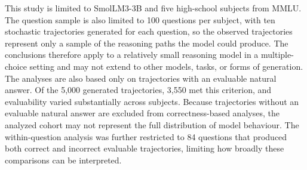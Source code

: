 \documentclass{article}
\begin{document}
This study is limited to SmolLM3-3B and five high-school subjects from MMLU. The question sample is also limited to 100 questions per subject, with ten stochastic trajectories generated for each question, so the observed trajectories represent only a sample of the reasoning paths the model could produce. The conclusions therefore apply to a relatively small reasoning model in a multiple-choice setting and may not extend to other models, tasks, or forms of generation. The analyses are also based only on trajectories with an evaluable natural answer. Of the 5,000 generated trajectories, 3,550 met this criterion, and evaluability varied substantially across subjects. Because trajectories without an evaluable natural answer are excluded from correctness-based analyses, the analyzed cohort may not represent the full distribution of model behaviour. The within-question analysis was further restricted to 84 questions that produced both correct and incorrect evaluable trajectories, limiting how broadly these comparisons can be interpreted.




\end{document}
